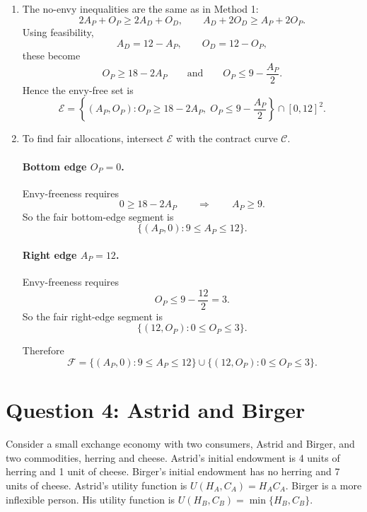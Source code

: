 \documentclass[12pt]{article}
\begin{document}
\begin{enumerate}[label=(\alph*)]
    \item
    The no-envy inequalities are the same as in Method 1:
    \[
    2A_P+O_P\ge 2A_D+O_D,
    \qquad
    A_D+2O_D\ge A_P+2O_P.
    \]
    Using feasibility,
    \[
    A_D=12-A_P,\qquad O_D=12-O_P,
    \]
    these become
    \[
    \boxed{O_P\ge 18-2A_P}
    \qquad\text{and}\qquad
    \boxed{O_P\le 9-\frac{A_P}{2}.}
    \]
    Hence the envy-free set is
    \[
    \boxed{\mathcal E
    =\left\{(A_P,O_P):
    O_P\ge 18-2A_P,\;
    O_P\le 9-\frac{A_P}{2}\right\}
    \cap [0,12]^2.}
    \]

    \item
    To find fair allocations, intersect \(\mathcal E\) with the contract curve \(\mathcal C\).

    \paragraph{Bottom edge \(O_P=0\).}
    Envy-freeness requires
    \[
    0\ge 18-2A_P
    \qquad\Longrightarrow\qquad
    A_P\ge 9.
    \]
    So the fair bottom-edge segment is
    \[
    \{(A_P,0): 9\le A_P\le 12\}.
    \]

    \paragraph{Right edge \(A_P=12\).}
    Envy-freeness requires
    \[
    O_P\le 9-\frac{12}{2}=3.
    \]
    So the fair right-edge segment is
    \[
    \{(12,O_P): 0\le O_P\le 3\}.
    \]

    Therefore
    \[
    \boxed{
    \mathcal F
    =
    \{(A_P,0): 9\le A_P\le 12\}
    \cup
    \{(12,O_P): 0\le O_P\le 3\}.}
    \]
\end{enumerate}

\newpage
\section{Question 4: Astrid and Birger}

\noindent
Consider a small exchange economy with two consumers, Astrid and Birger, and two commodities, herring and cheese. Astrid's initial endowment is 4 units of herring and 1 unit of cheese. Birger's initial endowment has no herring and 7 units of cheese. Astrid's utility function is \(U(H_A,C_A)=H_AC_A\). Birger is a more inflexible person. His utility function is \(U(H_B,C_B)=\min\{H_B,C_B\}\).
\end{document}
